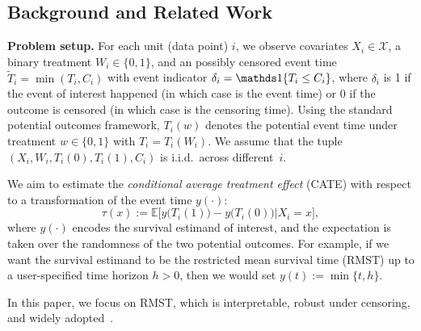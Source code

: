 \subsection{Background and Related Work}
\label{ch04:sec:background}

\textbf{Problem setup.}
For each unit (data point) $i$, we observe covariates $X_i \in \mathcal{X}$, a binary treatment ${W_i \in \{0,1\}}$, and an  possibly censored event time $\widetilde{T}_i = \min(T_i, C_i)$ with event indicator $\delta_i = {\ChFourInd\{T_i \leq C_i\}}$, where $\delta_i$ is 1 if the event of interest happened (in which case  is the event time) or 0 if the outcome is censored (in which case  is the censoring time).
Using the standard potential outcomes framework, $T_i(w)$ denotes the potential event time under treatment $w\in\{0,1\}$ with $T_i=T_i(W_i)$.
We assume that the tuple $(X_i,W_i,T_i(0),T_i(1),C_i)$ is i.i.d.~across different~$i$.

We aim to estimate the \emph{conditional average treatment effect} (CATE) with respect to a transformation of the event time $y(\cdot)$:
\begin{equation} \label{ch04:eq:cate}
    \tau(x) := \mathbb{E}\big[ y\big(T_i(1)\big) - y\big(T_i(0)\big) | X_i=x\big],
\end{equation}
where $y(\cdot)$ encodes the survival estimand of interest, and the expectation is taken over the randomness of the two potential outcomes.
For example, if we want the survival estimand to be the restricted mean survival time (RMST) up to a user-specified time horizon $h>0$, then we would set $y(t):=\min\{t,h\}$.

In this paper, we focus on RMST, which is interpretable, robust under censoring, and widely adopted~\citep{shen2018estimating,curth2021survite,ch04:cui2023estimating}.

